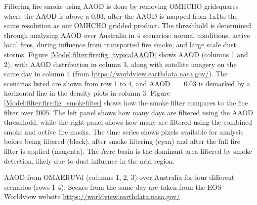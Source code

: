     Filtering fire smoke using AAOD is done by removing OMHCHO gridsquares where the AAOD is above a 0.03, after the AAOD is mapped from 1x1\degr to the same \highhr resolution as our OMHCHO gridded product.
    The threshhold is determined through analysing AAOD over Australia in 4 scenarios: normal conditions, active local fires, during influence from transported fire smoke, and large scale dust storms.
    Figure \ref{Model:filter:fire:fig_typicalAAOD} shows AAOD (columns 1 and 2), with AAOD distribution in column 3, along with satellite imagery on the same day in column 4 (from \url{https://worldview.earthdata.nasa.gov/}).
    The scenarios listed are shown from row 1 to 4, and AAOD $=$ 0.03 is demarked by a horizontal line in the density plots in column 3.
    Figure \ref{Model:filter:fire:fig_smokefilter} shows how the smoke filter compares to the fire filter over 2005.
    The left panel shows how many days are filtered using the AAOD threshhold, while the right panel shows how many are filtered using the combined smoke and active fire masks.
    The time series shows pixels available for analysis before being filtered (black), after smoke filtering (cyan) and after the full fire filter is applied (magenta).
    The Ayre basin is the dominant area filtered by smoke detection, likely due to dust influence in the arid region.
    
      {AAOD from OMAERUVd (columns 1, 2, 3) over Australia for four different scenarios (rows 1-4). Scenes from the same day are taken from the EOS Worldview website \url{https://worldview.earthdata.nasa.gov/}.}
      {\label{Model:filter:fire:fig_typicalAAOD}}
    
    
